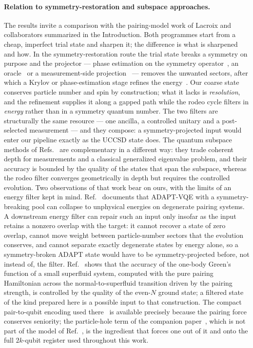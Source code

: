 \documentclass[
  aps,            %
  prc,            %
  reprint,        %
  superscriptaddress,
  floatfix,
  nofootinbib
]{revtex4-2}
\begin{document}
\paragraph{Relation to symmetry-restoration and subspace approaches.}
The results invite a comparison with the pairing-model work of Lacroix and
collaborators summarized in the Introduction.  Both programmes start from a
cheap, imperfect trial state and sharpen it; the difference is what is
sharpened and how.  In the symmetry-restoration route the trial state breaks a
symmetry on purpose and the projector --- phase estimation on the symmetry
operator~\cite{Lacroix2020}, an oracle~\cite{RuizGuzman2023} or a
measurement-side projection~\cite{RuizGuzman2024} --- removes the unwanted
sectors, after which a Krylov or phase-estimation stage refines the
energy~\cite{RuizGuzman2022}.  Our coarse state conserves particle number and
spin by construction; what it lacks is \emph{resolution}, and the refinement
supplies it along a gapped path while the rodeo cycle filters in
\emph{energy} rather than in a symmetry quantum number.  The two filters are
structurally the same resource --- one ancilla, a controlled unitary and a
post-selected measurement --- and they compose: a symmetry-projected input
would enter our pipeline exactly as the UCCSD state does.  The quantum
subspace methods of Refs.~\cite{Zhang2025,AychetClaisse2026,BeaujeaultTaudiere2024}
are complementary in a different way: they trade coherent depth for
measurements and a classical generalized eigenvalue problem, and their
accuracy is bounded by the quality of the states that span the subspace,
whereas the rodeo filter converges geometrically in depth but requires the
controlled evolution.  Two observations of that work bear on ours, with the
limits of an energy filter kept in mind.  Ref.~\cite{Zhang2024} documents that
ADAPT-VQE with a symmetry-breaking pool can collapse to unphysical energies on
degenerate pairing systems.  A downstream energy filter can repair such an
input only insofar as the input retains a nonzero overlap with the target:
it cannot recover a state of zero overlap, cannot move weight between
particle-number sectors that the evolution conserves, and cannot separate
exactly degenerate states by energy alone, so a symmetry-broken ADAPT state
would have to be symmetry-projected before, not instead of, the filter.
Ref.~\cite{AychetClaisse2026} shows that the accuracy of the one-body Green's
function of a small superfluid system, computed with the pure pairing
Hamiltonian across the normal-to-superfluid transition driven by the pairing
strength, is controlled by the quality of the even-$N$ ground state; a
filtered state of the kind prepared here is a possible input to that
construction.  The compact pair-to-qubit encoding used
there~\cite{Lacroix2020,AychetClaisse2026} is available precisely because
the pairing force conserves seniority; the particle-hole term of the
companion paper~\cite{PHcompanion}, which is not part of the model of
Ref.~\cite{AychetClaisse2026}, is the ingredient that forces one out of it
and onto the full $2k$-qubit register used throughout this work.
\end{document}
